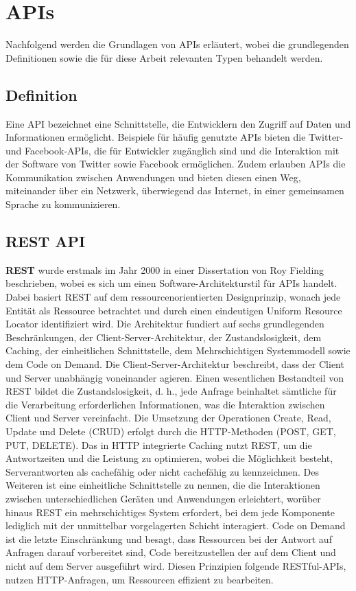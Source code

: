 
\section{APIs} %
\label{sec:apigrundlagen}
Nachfolgend werden die Grundlagen von APIs erläutert, wobei die grundlegenden Definitionen sowie die für diese Arbeit relevanten Typen behandelt werden.
\subsection{Definition} %
\label{sec:grundlegendedefinitionvonapi}
Eine API bezeichnet eine Schnittstelle, die Entwicklern den Zugriff auf Daten und Informationen ermöglicht. Beispiele für häufig genutzte APIs bieten die Twitter- und Facebook-APIs, die für Entwickler zugänglich sind und die Interaktion mit der Software von Twitter sowie Facebook ermöglichen. Zudem erlauben APIs die Kommunikation zwischen Anwendungen und bieten diesen einen Weg, miteinander über ein Netzwerk, überwiegend das Internet, in einer gemeinsamen Sprache zu kommunizieren.  \citep{apistrategyguide}
\newpage
\subsection{REST API} %
\label{sec:restapi}
 \textbf{REST} wurde erstmals im Jahr 2000 in einer Dissertation von Roy Fielding beschrieben, wobei es sich um einen Software-Architekturstil für APIs handelt. Dabei basiert REST auf dem ressourcenorientierten Designprinzip, wonach jede Entität als Ressource betrachtet und durch einen eindeutigen Uniform Resource Locator identifiziert wird. Die Architektur fundiert auf sechs grundlegenden Beschränkungen, der Client-Server-Architektur, der Zustandslosigkeit, dem Caching, der einheitlichen Schnittstelle, dem Mehrschichtigen Systemmodell sowie dem Code on Demand. Die Client-Server-Architektur beschreibt, dass der Client und Server unabhängig voneinander agieren. Einen wesentlichen Bestandteil von REST bildet die Zustandslosigkeit, d. h., jede Anfrage beinhaltet sämtliche für die Verarbeitung erforderlichen Informationen, was die Interaktion zwischen Client und Server vereinfacht. Die Umsetzung der Operationen Create, Read, Update und Delete (CRUD) erfolgt durch die HTTP-Methoden (POST, GET, PUT, DELETE). Das in HTTP integrierte Caching nutzt REST, um die Antwortzeiten und die Leistung zu optimieren, wobei die Möglichkeit besteht, Serverantworten als cachefähig oder nicht cachefähig zu kennzeichnen. Des Weiteren ist eine einheitliche Schnittstelle zu nennen, die die Interaktionen zwischen unterschiedlichen Geräten und Anwendungen erleichtert, worüber hinaus REST ein mehrschichtiges System erfordert, bei dem jede Komponente lediglich mit der unmittelbar vorgelagerten Schicht interagiert. Code on Demand ist die letzte Einschränkung und besagt, dass Ressourcen bei der Antwort auf Anfragen darauf vorbereitet sind, Code bereitzustellen der auf dem Client und nicht auf dem Server ausgeführt wird. Diesen Prinzipien folgende RESTful-APIs, nutzen HTTP-Anfragen, um Ressourcen effizient zu bearbeiten.  \citep{Fielding2000}  \citep{graphqlreplacerest}

